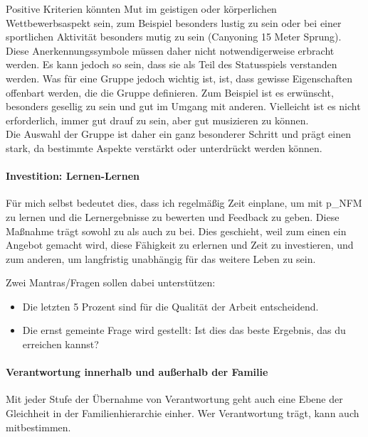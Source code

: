 Positive Kriterien könnten Mut im geistigen oder körperlichen Wettbewerbsaspekt sein, zum Beispiel besonders lustig zu sein oder bei einer sportlichen Aktivität besonders mutig zu sein (Canyoning 15 Meter Sprung).\\


Diese Anerkennungssymbole müssen daher nicht notwendigerweise erbracht werden. Es kann jedoch so sein, dass sie als Teil des Statusspiels verstanden werden. Was für eine Gruppe jedoch wichtig ist, ist, dass gewisse Eigenschaften offenbart werden, die die Gruppe definieren. Zum Beispiel ist es erwünscht, besonders gesellig zu sein und gut im Umgang mit anderen. Vielleicht ist es nicht erforderlich, immer gut drauf zu sein, aber gut musizieren zu können.\\


Die Auswahl der Gruppe ist daher ein ganz besonderer Schritt und prägt einen stark, da bestimmte Aspekte verstärkt oder unterdrückt werden können.

\paragraph{Investition: Lernen-Lernen}

Für mich selbst bedeutet dies, dass ich regelmäßig Zeit einplane, um mit \gls{p_NFM} zu lernen und die Lernergebnisse zu bewerten und Feedback zu geben. Diese Maßnahme trägt sowohl zu \NFMOOne als auch zu \NFMOThree bei. Dies geschieht, weil zum einen ein Angebot gemacht wird, diese Fähigkeit zu erlernen und Zeit zu investieren, und zum anderen, um langfristig unabhängig für das weitere Leben zu sein.

Zwei Mantras/Fragen sollen dabei unterstützen:
\begin{itemize}
	\item Die letzten 5 Prozent sind für die Qualität der Arbeit entscheidend.
	\item Die ernst gemeinte Frage wird gestellt: Ist dies das beste Ergebnis, das du erreichen kannst?
\end{itemize}

\paragraph{Verantwortung innerhalb und außerhalb der Familie}

Mit jeder Stufe der Übernahme von Verantwortung geht auch eine Ebene der Gleichheit in der Familienhierarchie einher. Wer Verantwortung trägt, kann auch mitbestimmen.

